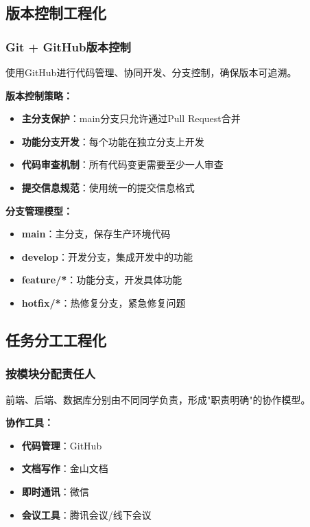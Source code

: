 \documentclass[a4paper]{article}
\begin{document}
\subsection{版本控制工程化}

\subsubsection{Git + GitHub版本控制}

使用GitHub进行代码管理、协同开发、分支控制，确保版本可追溯。

\textbf{版本控制策略：}
\begin{itemize}
    \item \textbf{主分支保护}：main分支只允许通过Pull Request合并
    \item \textbf{功能分支开发}：每个功能在独立分支上开发
    \item \textbf{代码审查机制}：所有代码变更需要至少一人审查
    \item \textbf{提交信息规范}：使用统一的提交信息格式
\end{itemize}

\textbf{分支管理模型：}
\begin{itemize}
    \item \textbf{main}：主分支，保存生产环境代码
    \item \textbf{develop}：开发分支，集成开发中的功能
    \item \textbf{feature/*}：功能分支，开发具体功能
    \item \textbf{hotfix/*}：热修复分支，紧急修复问题
\end{itemize}

\subsection{任务分工工程化}

\subsubsection{按模块分配责任人}

前端、后端、数据库分别由不同同学负责，形成"职责明确"的协作模型。

\textbf{协作工具：}
\begin{itemize}
    \item \textbf{代码管理}：GitHub
    \item \textbf{文档写作}：金山文档
    \item \textbf{即时通讯}：微信
    \item \textbf{会议工具}：腾讯会议/线下会议
\end{itemize}
\end{document}
